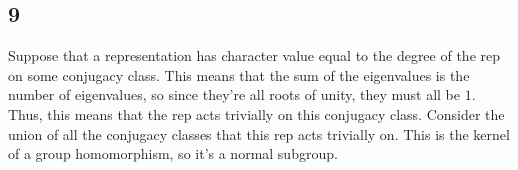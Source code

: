 \documentclass{article}
\begin{document}
\subsection*{9}
Suppose that a representation has character value equal to the degree of the rep on some conjugacy class. This means that the sum of the eigenvalues is the number of eigenvalues, so since they're all roots of unity, they must all be $1$. Thus, this means that the rep acts trivially on this conjugacy class. Consider the union of all the conjugacy classes that this rep acts trivially on. This is the kernel of a group homomorphism, so it's a normal subgroup.
\end{document}
